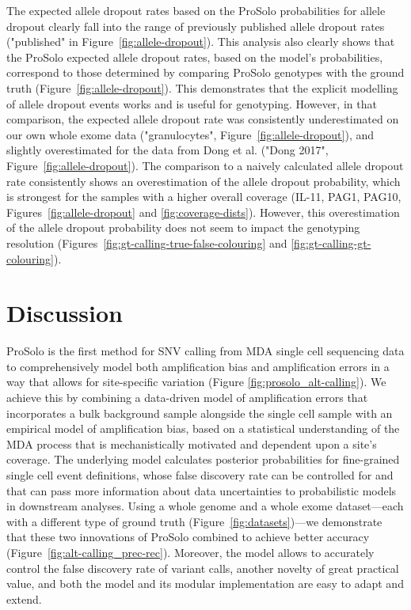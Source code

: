 \documentclass[12pt,inline]{wlscirep}
\begin{document}
The expected allele dropout rates based on the ProSolo probabilities for allele dropout clearly fall into the range of previously published allele dropout rates\cite{wang_clonal_2014,hou_single-cell_2012,xu_single-cell_2012,ling_evaluation_2009,spits_whole-genome_2006,spits_optimization_2006,renwick_proof_2006,lodato_somatic_2015} ("published" in Figure~\ref{fig:allele-dropout}).
This analysis also clearly shows that the ProSolo expected allele dropout rates, based on the model's probabilities, correspond to those determined by comparing ProSolo genotypes with the ground truth (Figure~\ref{fig:allele-dropout}).
This demonstrates that the explicit modelling of allele dropout events works and is useful for genotyping.
However, in that comparison, the expected allele dropout rate was consistently underestimated on our own whole exome data ("granulocytes", Figure~\ref{fig:allele-dropout}), and slightly overestimated for the data from Dong et al.\cite{dong_accurate_2017} ("Dong 2017", Figure~\ref{fig:allele-dropout}).
The comparison to a naively calculated allele dropout rate consistently shows an overestimation of the allele dropout probability, which is strongest for the samples with a higher overall coverage (IL-11, PAG1, PAG10, Figures~\ref{fig:allele-dropout} and \ref{fig:coverage-dists}).
However, this overestimation of the allele dropout probability does not seem to impact the genotyping resolution (Figures~\ref{fig:gt-calling-true-false-colouring} and \ref{fig:gt-calling-gt-colouring}).


\section{Discussion}

ProSolo is the first method for SNV calling from MDA single cell sequencing data to comprehensively model both amplification bias and amplification errors in a way that allows for site-specific variation (Figure \ref{fig:prosolo_alt-calling}).
We achieve this by combining a data-driven model of amplification errors that incorporates a bulk background sample alongside the single cell sample with an empirical model of amplification bias, based on a statistical understanding of the MDA process that is mechanistically motivated and dependent upon a site's coverage.
The underlying model calculates posterior probabilities for fine-grained single cell event definitions, whose false discovery rate can be controlled for and that can pass more information about data uncertainties to probabilistic models in downstream analyses.
Using a whole genome and a whole exome dataset---each with a different type of ground truth (Figure~\ref{fig:datasets})---we demonstrate that these two innovations of ProSolo combined to achieve better accuracy (Figure~\ref{fig:alt-calling_prec-rec}).
Moreover, the model allows to accurately control the false discovery rate of variant calls, another novelty of great practical value, and both the model and its modular implementation are easy to adapt and extend.
\end{document}
